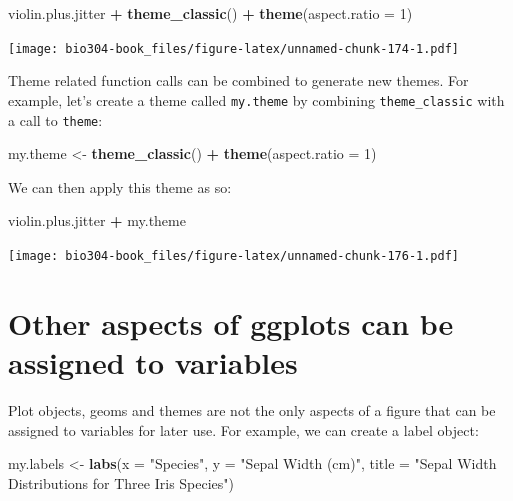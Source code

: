 \documentclass[]{book}
\newenvironment{Shaded}{\begin{snugshade}}{\end{snugshade}}
\newcommand{\DataTypeTok}[1]{\textcolor[rgb]{0.13,0.29,0.53}{#1}}
\newcommand{\DecValTok}[1]{\textcolor[rgb]{0.00,0.00,0.81}{#1}}
\newcommand{\KeywordTok}[1]{\textcolor[rgb]{0.13,0.29,0.53}{\textbf{#1}}}
\newcommand{\NormalTok}[1]{#1}
\newcommand{\OperatorTok}[1]{\textcolor[rgb]{0.81,0.36,0.00}{\textbf{#1}}}
\newcommand{\StringTok}[1]{\textcolor[rgb]{0.31,0.60,0.02}{#1}}
\theoremstyle{definition}
\theoremstyle{definition}
\theoremstyle{definition}
\theoremstyle{remark}
\begin{document}
\begin{Shaded}
\begin{Highlighting}[]
\NormalTok{violin.plus.jitter }\OperatorTok{+}\StringTok{ }\KeywordTok{theme_classic}\NormalTok{() }\OperatorTok{+}\StringTok{ }\KeywordTok{theme}\NormalTok{(}\DataTypeTok{aspect.ratio =} \DecValTok{1}\NormalTok{)}
\end{Highlighting}
\end{Shaded}

\texttt{[image: bio304-book\_files/figure-latex/unnamed-chunk-174-1.pdf]}

Theme related function calls can be combined to generate new themes. For
example, let's create a theme called \texttt{my.theme} by combining
\texttt{theme\_classic} with a call to \texttt{theme}:

\begin{Shaded}
\begin{Highlighting}[]
\NormalTok{my.theme <-}\StringTok{ }\KeywordTok{theme_classic}\NormalTok{()  }\OperatorTok{+}\StringTok{ }\KeywordTok{theme}\NormalTok{(}\DataTypeTok{aspect.ratio =} \DecValTok{1}\NormalTok{)}
\end{Highlighting}
\end{Shaded}

We can then apply this theme as so:

\begin{Shaded}
\begin{Highlighting}[]
\NormalTok{violin.plus.jitter }\OperatorTok{+}\StringTok{ }\NormalTok{my.theme}
\end{Highlighting}
\end{Shaded}

\texttt{[image: bio304-book\_files/figure-latex/unnamed-chunk-176-1.pdf]}

\hypertarget{other-aspects-of-ggplots-can-be-assigned-to-variables}{%
\section{Other aspects of ggplots can be assigned to
variables}\label{other-aspects-of-ggplots-can-be-assigned-to-variables}}

Plot objects, geoms and themes are not the only aspects of a figure that
can be assigned to variables for later use. For example, we can create a
label object:

\begin{Shaded}
\begin{Highlighting}[]
\NormalTok{my.labels <-}\StringTok{ }\KeywordTok{labs}\NormalTok{(}\DataTypeTok{x =} \StringTok{"Species"}\NormalTok{, }\DataTypeTok{y =} \StringTok{"Sepal Width (cm)"}\NormalTok{, }
                  \DataTypeTok{title =} \StringTok{"Sepal Width Distributions for Three Iris Species"}\NormalTok{)}
\end{Highlighting}
\end{Shaded}
\end{document}

